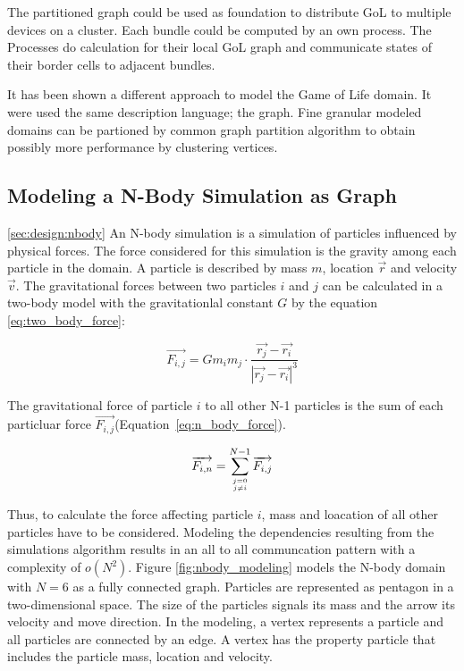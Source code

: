 The partitioned graph could be used as foundation to distribute GoL to
multiple devices on a cluster. Each bundle could be computed by an own
process. The Processes do calculation for their local GoL graph and
communicate states of their border cells to adjacent bundles.

It has been shown a different approach to model the Game of Life
domain. It were used the same description language; the graph.
Fine granular modeled domains can be partioned by common graph
partition algorithm to obtain possibly more performance by
clustering vertices.


\subsection{Modeling a N-Body Simulation as Graph}
\ref{sec:design:nbody}
An N-body simulation is a simulation of particles influenced by
physical forces. The force considered for this simulation is the
gravity among each particle in the domain.  A particle is described by
mass $m$, location $\overrightarrow{r}$ and velocity $\overrightarrow{v}$.  The gravitational forces
between two particles $i$ and $j$ can be calculated in a two-body model 
with the gravitationlal constant $G$ by the equation \ref{eq:two_body_force}:

\begin{equation}
  \label{eq:two_body_force}
  \overrightarrow{F_{i,j}} = G  m_i  m_j \cdot \frac{\overrightarrow{r_j} - \overrightarrow{r_i}}{|\overrightarrow{r_j} - \overrightarrow{r_i}|^3}
\end{equation}

The gravitational force of particle $i$ to all other N-1 particles
is the sum of each particluar force $\overrightarrow{F_{i,j}}$(Equation~\ref{eq:n_body_force}).

\begin{equation}
  \label{eq:n_body_force}
  \overrightarrow{F_{i,n}} = \sum_{j = 0 \atop j \neq i}^{N-1} \overrightarrow{F_{i,j}}
\end{equation}

Thus, to calculate the force affecting particle $i$, mass and
loacation of all other particles have to be considered. Modeling the
dependencies resulting from the simulations algorithm results in an
all to all communcation pattern with a complexity of $o(N^2)$. Figure
\ref{fig:nbody_modeling} models the N-body domain with $N = 6$ as a
fully connected graph. Particles are represented as pentagon in a
two-dimensional space. The size of the particles signals its mass and
the arrow its velocity and move direction.  In the modeling, a vertex
represents a particle and all particles are connected by an edge. A
vertex has the property particle that includes the particle mass,
location and velocity.

